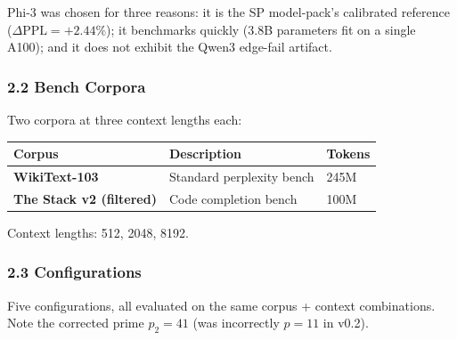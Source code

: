 \documentclass[
  11pt,
]{article}
\begin{document}
Phi-3 was chosen for three reasons: it is the SP model-pack's calibrated
reference (\(\Delta\mathrm{PPL} = +2.44\%\)); it benchmarks quickly
(3.8B parameters fit on a single A100); and it does not exhibit the
Qwen3 edge-fail artifact.

\hypertarget{bench-corpora}{%
\subsubsection{2.2 Bench Corpora}\label{bench-corpora}}

Two corpora at three context lengths each:

\begin{longtable}[]{@{}lll@{}}
\toprule
Corpus & Description & Tokens\tabularnewline
\midrule
\endhead
\textbf{WikiText-103} & Standard perplexity bench & 245M\tabularnewline
\textbf{The Stack v2 (filtered)} & Code completion bench &
100M\tabularnewline
\bottomrule
\end{longtable}

Context lengths: 512, 2048, 8192.

\hypertarget{configurations}{%
\subsubsection{2.3 Configurations}\label{configurations}}

Five configurations, all evaluated on the same corpus + context
combinations. Note the corrected prime \(p_2 = 41\) (was incorrectly
\(p = 11\) in v0.2).
\end{document}
